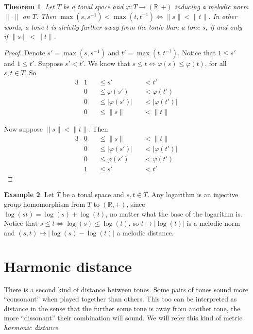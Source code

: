 \documentclass[a4paper]{book}
\newtheorem{theorem}{Theorem}[chapter]
\theoremstyle{definition}
\newtheorem{example}[theorem]{Example}
\begin{document}
\begin{theorem}
    \label{order_preserving_homomorphism}
    Let $T$ be a tonal space and $\varphi : T \to (\mathbb{R},+)$ inducing a melodic norm $\| \cdot \|$ on $T$.
    Then $ \max(s,s^{-1}) < \max(t,t^{-1}) \Leftrightarrow \|s\|<\|t\|$.
    In other words, a tone $t$ is strictly further away from the tonic than a tone $s$, if and only if $\|s\| < \|t\|$.
\end{theorem}
\begin{proof}
    Denote $s' = \max(s,s^{-1})$ and $t' = \max(t,t^{-1})$.
    Notice that $1 \leq s'$ and $1 \leq t'$.
    Suppose $s' < t'$.
    We know that $s \leq t \Leftrightarrow \varphi(s) \leq \varphi(t)$, for all $s,t \in T$.
    So 
    \begin{alignat*}{3}
        & 1 & &\leq s'             & &<  t' \\
        & 0 & &\leq \varphi(s')    & &<  \varphi(t') \\
        & 0 & &\leq |\varphi(s')|  & &<  |\varphi(t')| \\
        & 0 & &\leq \|s\|          & &<  \|t\|
    \end{alignat*}
    
    Now suppose $\|s\|<\|t\|$.
    Then 
    \begin{alignat*}{3}
        & 0 & &\leq \|s\|          & &<  \|t\| \\
        & 0 & &\leq |\varphi(s')|  & &<  |\varphi(t')| \\
        & 0 & &\leq \varphi(s')    & &<  \varphi(t') \\
        & 1 & &\leq s'             & &<  t' 
    \end{alignat*}
\end{proof}

\begin{example}
    \label{log_as_melodic_distance}
    Let $T$ be a tonal space and $s,t \in T$.
    Any logarithm is an injective group homomorphism from $T$ to $(\mathbb{R},+)$, since $\log(st) = \log(s) + \log(t)$, no matter what the base of the logarithm is.
    Notice that $s \leq t \Leftrightarrow \log(s) \leq \log(t)$, so $t \mapsto |\log(t)|$ is a melodic norm and $(s,t) \mapsto |\log(s)-\log(t)|$ a melodic distance.
\end{example}

\section{Harmonic distance}
There is a second kind of distance between tones.
Some pairs of tones sound more ``consonant'' when played together than others.
This too can be interpreted as distance in the sense that the further some tone is away from another tone, the more ``dissonant'' their combination will sound.
We will refer this kind of metric \emph{harmonic distance}.
\end{document}
